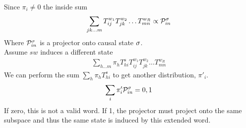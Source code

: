 Since $\pi_i \ne 0$ the inside sum
\begin{align*}
\sum_{jk \ldots m}T_{ij}^{w_1} T_{jk}^{w_2} \ldots T_{mn}^{w_R} \propto \mathcal{P}_{in}^{\sigma}
\end{align*}
Where $\mathcal{P}_{in}^{\sigma}$ is a projector onto causal state $\sigma$.\\
Assume $sw$ induces a different state
\begin{align*}
\sum_{h \ldots m}\pi_h T_{hi}^s T_{ij}^{w_1} T_{jk}^{w_2} \ldots T_{mn}^{w_R}
\end{align*}
We can perform the sum $\sum_{h}\pi_h T_{hi}^s$ to get another distribution, $\pi'_i$.\\
\begin{align*}
\sum_{i}\pi'_{i} \mathcal{P}_{in}^{\sigma} = 0, 1
\end{align*}
If zero, this is not a valid word. If 1, the projector must project onto the same subspace and thus the same state is induced by this extended word.

\ifx\master\undefined\fi
